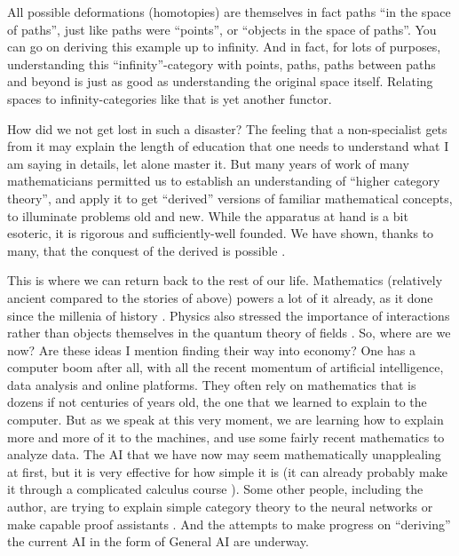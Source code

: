 \documentclass{article}
\begin{document}
All possible deformations (homotopies) are themselves in fact paths “in the space of paths”, just like paths were “points”, or “objects in the space of paths”. You can go on deriving this example up to infinity. And in fact, for lots of purposes, understanding this “infinity”-category with points, paths, paths between paths and beyond is just as good as understanding the original space itself. Relating spaces to infinity-categories like that is yet another functor.

How did we not get lost in such a disaster? The feeling that a non-specialist gets from it may explain the length of education that one needs to understand what I am saying in details, let alone master it. But many years of work of many mathematicians permitted us to establish an understanding of “higher category theory”, and apply it to get “derived” versions of familiar mathematical concepts, to illuminate problems old and new. While the apparatus at hand is a bit esoteric, it is rigorous and sufficiently-well founded. We have shown, thanks to many, that the conquest of the derived is possible \cite{LURIE}.

This is where we can return back to the rest of our life. Mathematics (relatively ancient compared to the stories of above) powers a lot of it already, as it done since the millenia of history \cite{CHILDE}. Physics also stressed the importance of interactions rather than objects themselves in the quantum theory of fields \cite{WEINBERG}. So, where are we now? Are these ideas I mention finding their way into economy? One has a computer boom after all, with all the recent momentum of artificial intelligence, data analysis and online platforms. They often rely on mathematics that is dozens if not centuries of years old, the one that we learned to explain to the computer. But as we speak at this very moment, we are learning how to explain more and more of it to the machines, and use some fairly recent mathematics to analyze data. The AI that we have now may seem mathematically unapplealing at first, but it is very effective for how simple it is (it can already probably make it through a complicated calculus course \cite{LAMPCHART}). Some other people, including the author, are trying to explain simple category theory to the neural networks or make capable proof assistants \cite{HOTT}. And the attempts to make progress on “deriving” the current AI in the form of General AI are underway.
\end{document}

